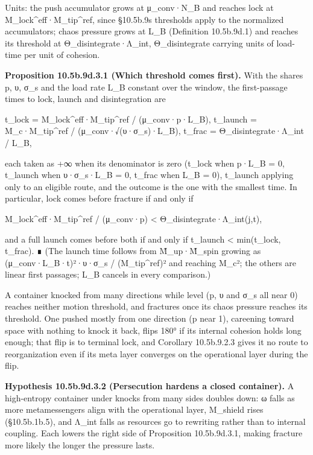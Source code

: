 \documentclass[
]{article}
\begin{document}
Units: the push accumulator grows at μ\_conv·N\_B and reaches lock at
M\_lock\^{}eff·M\_tip\^{}ref, since §10.5b.9\textquotesingle s
thresholds apply to the normalized accumulators; chaos pressure grows at
L\_B (Definition 10.5b.9d.1) and reaches its threshold at
Θ\_disintegrate·Λ\_int, Θ\_disintegrate carrying units of load-time per
unit of cohesion.

\textbf{Proposition 10.5b.9d.3.1 (Which threshold comes first).} With
the shares p, υ, σ\_s and the load rate L\_B constant over the window,
the first-passage times to lock, launch and disintegration are

t\_lock = M\_lock\^{}eff·M\_tip\^{}ref / (μ\_conv·p·L\_B), t\_launch =
M\_c·M\_tip\^{}ref / (μ\_conv·√(υ·σ\_s)·L\_B), t\_frac =
Θ\_disintegrate·Λ\_int / L\_B,

each taken as +∞ when its denominator is zero (t\_lock when p·L\_B = 0,
t\_launch when υ·σ\_s·L\_B = 0, t\_frac when L\_B = 0), t\_launch
applying only to an eligible route, and the outcome is the one with the
smallest time. In particular, lock comes before fracture if and only if

M\_lock\^{}eff·M\_tip\^{}ref / (μ\_conv·p) \textless{}
Θ\_disintegrate·Λ\_int(j,t),

and a full launch comes before both if and only if t\_launch \textless{}
min(t\_lock, t\_frac). ∎ (The launch time follows from M̃\_up·M̃\_spin
growing as (μ\_conv·L\_B·t)²·υ·σ\_s / (M\_tip\^{}ref)² and reaching
M\_c²; the others are linear first passages; L\_B cancels in every
comparison.)

A container knocked from many directions while level (p, υ and σ\_s all
near 0) reaches neither motion threshold, and fractures once its chaos
pressure reaches its threshold. One pushed mostly from one direction (p
near 1), careening toward space with nothing to knock it back, flips
180° if its internal cohesion holds long enough; that flip is to
terminal lock, and Corollary 10.5b.9.2.3 gives it no route to
reorganization even if its meta layer converges on the operational layer
during the flip.

\textbf{Hypothesis 10.5b.9d.3.2 (Persecution hardens a closed
container).} A high-entropy container under knocks from many sides
doubles down: ω falls as more metamessengers align with the operational
layer, M\_shield rises (§10.5b.1b.5), and Λ\_int falls as resources go
to rewriting rather than to internal coupling. Each lowers the right
side of Proposition 10.5b.9d.3.1, making fracture more likely the longer
the pressure lasts.
\end{document}
